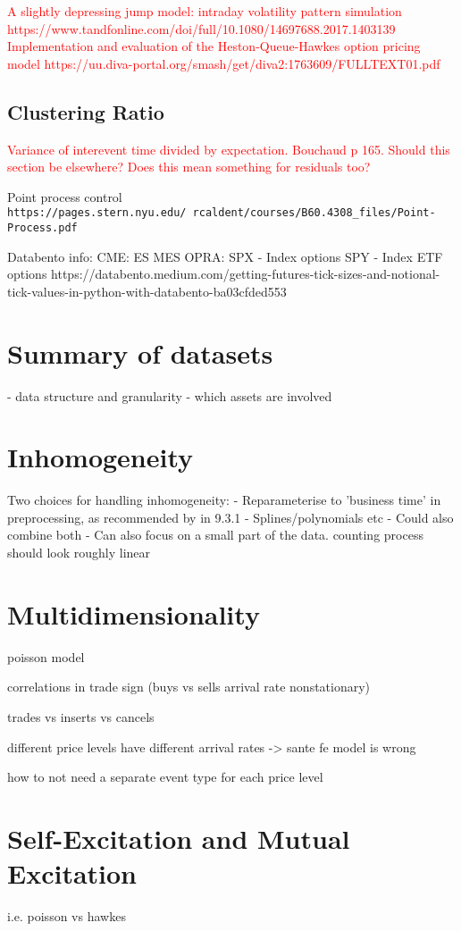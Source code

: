 \documentclass[honours,12pt]{unswthesis}
\numberwithin{equation}{section}
\begin{document}
\textcolor{red}{A slightly depressing jump model: intraday volatility pattern simulation https://www.tandfonline.com/doi/full/10.1080/14697688.2017.1403139}
\textcolor{red}{Implementation and evaluation of the Heston-Queue-Hawkes option pricing model https://uu.diva-portal.org/smash/get/diva2:1763609/FULLTEXT01.pdf}

\subsection{Clustering Ratio}
\textcolor{red}{Variance of interevent time divided by expectation. Bouchaud p 165. Should this section be elsewhere? Does this mean something for residuals too?}

Point process control \texttt{https://pages.stern.nyu.edu/~rcaldent/courses/B60.4308_files/Point-Process.pdf}


Databento info:
CME:
ES
MES
OPRA:
SPX - Index options
SPY - Index ETF options
https://databento.medium.com/getting-futures-tick-sizes-and-notional-tick-values-in-python-with-databento-ba03cfded553
\section{Summary of datasets}
- data structure and granularity
- which assets are involved

\section{Inhomogeneity}
Two choices for handling inhomogeneity:
- Reparameterise to 'business time' in preprocessing, as recommended by \cite{BouchaudEtAl} in 9.3.1
- Splines/polynomials etc
- Could also combine both
- Can also focus on a small part of the data. counting process should look roughly linear

\section{Multidimensionality}
poisson model

correlations in trade sign (buys vs sells arrival rate nonstationary)

trades vs inserts vs cancels

different price levels have different arrival rates -> sante fe model is wrong

how to not need a separate event type for each price level

\section{Self-Excitation and Mutual Excitation}
i.e. poisson vs hawkes
\end{document}
